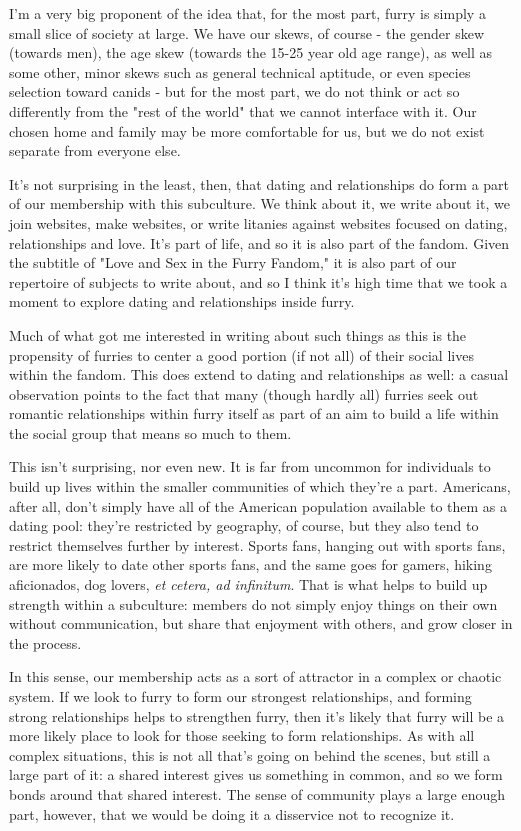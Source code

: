 
I'm a very big proponent of the idea that, for the most part, furry is simply a small slice of society at large. We have our skews, of course - the gender skew (towards men), the age skew (towards the 15-25 year old age range), as well as some other, minor skews such as general technical aptitude, or even species selection toward canids - but for the most part, we do not think or act so differently from the "rest of the world" that we cannot interface with it. Our chosen home and family may be more comfortable for us, but we do not exist separate from everyone else.

It's not surprising in the least, then, that dating and relationships do form a part of our membership with this subculture. We think about it, we write about it, we join websites, make websites, or write litanies against websites focused on dating, relationships and love. It's part of life, and so it is also part of the fandom. Given the subtitle of "Love and Sex in the Furry Fandom," it is also part of our repertoire of subjects to write about, and so I think it's high time that we took a moment to explore dating and relationships inside furry.

Much of what got me interested in writing about such things as this is the propensity of furries to center a good portion (if not all) of their social lives within the fandom. This does extend to dating and relationships as well: a casual observation points to the fact that many (though hardly all) furries seek out romantic relationships within furry itself as part of an aim to build a life within the social group that means so much to them.

This isn't surprising, nor even new. It is far from uncommon for individuals to build up lives within the smaller communities of which they're a part. Americans, after all, don't simply have all of the American population available to them as a dating pool: they're restricted by geography, of course, but they also tend to restrict themselves further by interest. Sports fans, hanging out with sports fans, are more likely to date other sports fans, and the same goes for gamers, hiking aficionados, dog lovers, \emph{et cetera, ad infinitum}. That is what helps to build up strength within a subculture: members do not simply enjoy things on their own without communication, but share that enjoyment with others, and grow closer in the process.

In this sense, our membership acts as a sort of attractor in a complex or chaotic system. If we look to furry to form our strongest relationships, and forming strong relationships helps to strengthen furry, then it's likely that furry will be a more likely place to look for those seeking to form relationships. As with all complex situations, this is not all that's going on behind the scenes, but still a large part of it: a shared interest gives us something in common, and so we form bonds around that shared interest. The sense of community plays a large enough part, however, that we would be doing it a disservice not to recognize it.

